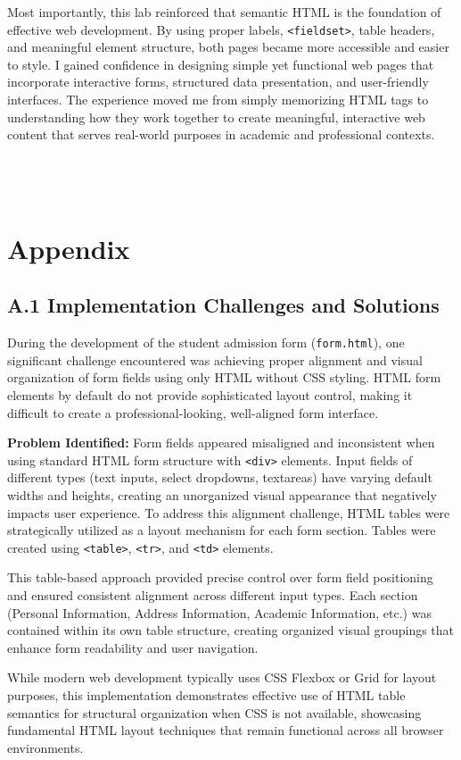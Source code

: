 \documentclass[twoside]{article}
\begin{document}
Most importantly, this lab reinforced that semantic HTML is the foundation of effective web development. By using proper labels, \texttt{<fieldset>}, table headers, and meaningful element structure, both pages became more accessible and easier to style. I gained confidence in designing simple yet functional web pages that incorporate interactive forms, structured data presentation, and user-friendly interfaces. The experience moved me from simply memorizing HTML tags to understanding how they work together to create meaningful, interactive web content that serves real-world purposes in academic and professional contexts.\\
\\
\\
\\


\begin{center}
\textasteriskcentered\quad\textasteriskcentered\quad\textasteriskcentered %
\end{center}

\newpage
\appendix
\section*{Appendix}

\subsection*{A.1 Implementation Challenges and Solutions}
During the development of the student admission form (\texttt{form.html}), one significant challenge encountered was achieving proper alignment and visual organization of form fields using only HTML without CSS styling. HTML form elements by default do not provide sophisticated layout control, making it difficult to create a professional-looking, well-aligned form interface.

\textbf{Problem Identified:} Form fields appeared misaligned and inconsistent when using standard HTML form structure with \texttt{<div>} elements. Input fields of different types (text inputs, select dropdowns, textareas) have varying default widths and heights, creating an unorganized visual appearance that negatively impacts user experience. To address this alignment challenge, HTML tables were strategically utilized as a layout mechanism for each form section. Tables were created using \texttt{<table>}, \texttt{<tr>}, and \texttt{<td>} elements.

This table-based approach provided precise control over form field positioning and ensured consistent alignment across different input types. Each section (Personal Information, Address Information, Academic Information, etc.) was contained within its own table structure, creating organized visual groupings that enhance form readability and user navigation.

While modern web development typically uses CSS Flexbox or Grid for layout purposes, this implementation demonstrates effective use of HTML table semantics for structural organization when CSS is not available, showcasing fundamental HTML layout techniques that remain functional across all browser environments.
\end{document}
